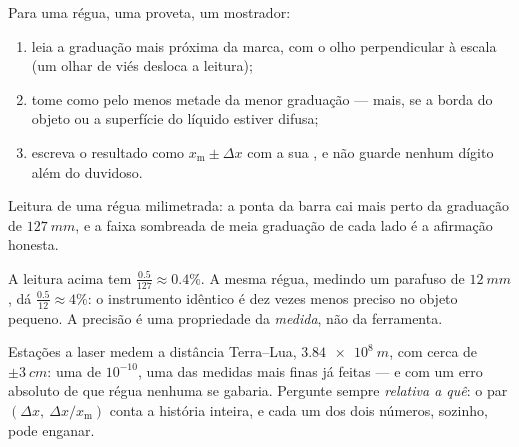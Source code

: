\begin{method}\label{met:g10:orders-of-magnitude:reading}
Para uma régua, uma proveta, um mostrador:
\begin{enumerate}
  \item leia a graduação mais próxima da marca, com o olho perpendicular
        à escala (um olhar de viés desloca a leitura);
  \item tome como  pelo menos metade da menor
        graduação --- mais, se a borda do objeto ou a superfície do
        líquido estiver difusa;
  \item escreva o resultado como $x_{\text{m}} \pm \Delta x$ com a sua
        , e não guarde nenhum dígito além do duvidoso.
\end{enumerate}
\end{method}

\begin{omfigure}

{\small Leitura de uma régua milimetrada: a ponta da barra cai mais perto
da graduação de $\qty{127}{mm}$, e a faixa sombreada de meia graduação
de cada lado é a afirmação honesta.}
\end{omfigure}

\begin{example}\label{ex:g10:orders-of-magnitude:reading}
A leitura acima tem 
$\frac{0.5}{127} \approx 0.4\%$. A mesma régua, medindo um parafuso de
$\qty{12}{mm}$, dá $\frac{0.5}{12} \approx 4\%$: o instrumento idêntico
é dez vezes menos preciso no objeto pequeno. A precisão é uma
propriedade da \emph{medida}, não da ferramenta.
\end{example}

\begin{remark}\label{rem:g10:orders-of-magnitude:precision}
Estações a laser medem a distância Terra--Lua, $\qty{3.84e8}{m}$, com
cerca de $\pm\qty{3}{cm}$: uma  de $10^{-10}$, uma das
medidas mais finas já feitas --- e com um erro absoluto de que régua
nenhuma se gabaria. Pergunte sempre \emph{relativa a quê}: o par
$(\Delta x,\ \Delta x / x_{\text{m}})$ conta a história inteira, e cada
um dos dois números, sozinho, pode enganar.
\end{remark}

